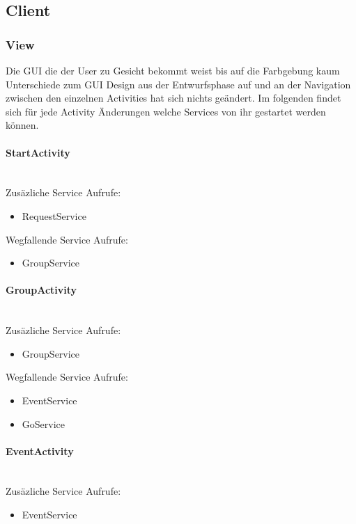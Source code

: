 \documentclass{scrartcl}
\begin{document}
\subsection{Client}
	\subsubsection{View}
	Die GUI die der User zu Gesicht bekommt weist bis auf die Farbgebung kaum Unterschiede zum GUI Design aus der Entwurfsphase auf und an der Navigation zwischen den einzelnen Activities hat sich nichts geändert.
Im folgenden findet sich für jede Activity Änderungen welche Services von ihr gestartet werden können. 
	
	\paragraph{StartActivity}$~~$\\
	Zusäzliche Service Aufrufe:
	\begin{itemize}
	\item RequestService
	\end{itemize}
	Wegfallende Service Aufrufe:
	\begin{itemize}
	\item GroupService
	\end{itemize}

	\paragraph{GroupActivity}$~~$\\

	Zusäzliche Service Aufrufe:
	\begin{itemize}
	\item GroupService
	\end{itemize}
	Wegfallende Service Aufrufe:
	\begin{itemize}
	\item EventService
	\item GoService
	\end{itemize}

	\paragraph{EventActivity}$~~$\\

	Zusäzliche Service Aufrufe:
	\begin{itemize}
	\item EventService
	\end{itemize}
 
\end{document}
